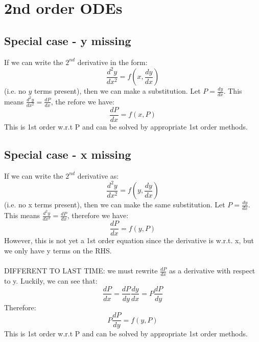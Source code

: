 \documentclass{scrartcl}
\begin{document}
\section{2nd order ODEs}

\subsection{Special case - y missing}
If we can write the $ 2^{nd} $ derivative in the form:
\begin{equation}
\frac{d^{2}y}{dx^{2}} = f(x, \frac{dy}{dx})
\end{equation}
(i.e. no $ y $ terms present), then we can make a substitution. Let $ P = \frac{dy}{dx} $. This means $ \frac{d^{2}y}{dx^{2}} = \frac{dP}{dx} $, the
refore we have:
\begin{equation}
\frac{dP}{dx} = f(x, P)
\end{equation}
This is 1st order w.r.t P and can be solved by appropriate 1st order methods.

\subsection{Special case - x missing}
If we can write the $ 2^{nd} $ derivative as:
\begin{equation}
\frac{d^{2}y}{dx^{2}} = f(y, \frac{dy}{dx})
\end{equation}
(i.e. no x terms present), then we can make the same substitution. Let $ P = \frac{dy}{dx} $. This means $ \frac{d^{2}y}{dx^{2}} = \frac{dP}{dx} $, therefore we have:
\begin{equation}
\frac{dP}{dx} = f(y, P)
\end{equation}
However, this is not yet a 1st order equation since the derivative is w.r.t. x, but we only have y terms on the RHS.
\\\\
DIFFERENT TO LAST TIME: we must rewrite $ \frac{dP}{dx} $ as a derivative with respect to y. Luckily, we can see that:
\begin{equation}
\frac{dP}{dx} = \frac{dP}{dy}\frac{dy}{dx} = P\frac{dP}{dy}
\end{equation}
Therefore:
\begin{equation}
P\frac{dP}{dy} = f(y, P)
\end{equation}
This is 1st order w.r.t P and can be solved by appropriate 1st order methods.
\end{document}
